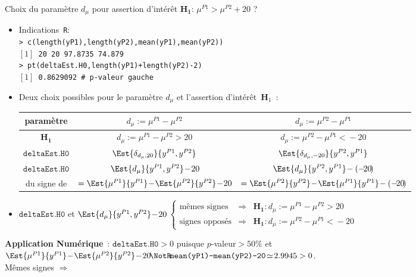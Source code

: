 \documentclass[11pt]{beamer}
\begin{document}
\begin{frame}
\frametitle{}

{\small
\begin{block}{Choix du paramètre $d_\mu$ pour assertion d'intérêt $\mathbf{H_1}$: $\mu^{P1} > \mu^{P2}+20$ ?}
\begin{itemize}
\item Indications~\texttt{R}:\\
\texttt{\scriptsize> c(length(yP1),length(yP2),mean(yP1),mean(yP2))\\
$[1]$ 20 20 97.8735 74.879 \\
> pt(deltaEst.H0,length(yP1)+length(yP2)-2)\\
$[1]$ 0.8629092  \# p-valeur gauche}\pause
\item Deux choix possibles pour le paramètre $d_\mu$ et l'assertion d'intérêt~$\mathbf{H}_1$~:\\
{\scriptsize \begin{tabular}{|c|c|c|}\hline
paramètre & $d_\mu\!:=\!\mu^{P1} \!-\! \mu^{P2}$ & $d_\mu:=\mu^{P2} \!-\! \mu^{P1}$\\\hline
$\mathbf{H_1}$ & $d_\mu\!:=\!\mu^{P1} \!-\! \mu^{P2}\!>\!20$ & $\!d_\mu:=\mu^{P2} \!-\! \mu^{P1}\!<\!-20$ \\\hline
$\mathtt{deltaEst.H0}$ & $\Est{\delta_{d_\mu,20}}{y^{P1},y^{P2}}$ & $\Est{\delta_{d_\mu,-20}}{y^{P2},y^{P1}}$ \\\hline
$\mathtt{deltaEst.H0}$ & $\Est{d_\mu}{y^{P1},y^{P2}}\!-\!20\!$ & $\Est{d_\mu}{y^{P2},y^{P1}}\!-(-\!20\!)$\\
du signe de & $=\Est{\mu^{P1}}{y^{P1}}\!-\!\Est{\mu^{P2}}{y^{P2}}\!-\!20\!$ & $=\Est{\mu^{P2}}{y^{P2}}\!-\!\Est{\mu^{P1}}{y^{P1}}\!-(-\!20\!)$ \\\hline
\end{tabular}}\pause
\item {\scriptsize $\mathtt{deltaEst.H0}$ et $\Est{d_\mu}{y^{P1},y^{P2}}\!-\!20\!$ $\left\{\begin{array}{ccl} 
\mbox{mêmes signes} & \Rightarrow & \mathbf{H_1}: d_\mu\!:=\!\mu^{P1} \!-\! \mu^{P2}\!>\!20\\
\mbox{signes opposés} &\Rightarrow &  \mathbf{H_1}: d_\mu\!:=\!\mu^{P2} \!-\! \mu^{P1}\!<\!-20
\end{array}\right.$
}\pause
\end{itemize}
\end{block}
}
{\small
\begin{block}{}
\textbf{Application Numérique}~: $\mathtt{deltaEst.H0}>0$ puisque $p$-valeur$>50\%$ \pause et 
$\Est{\mu^{P1}}{y^{P1}}\!-\!\Est{\mu^{P2}}{y^{P2}}\!-\!20\!\NotR\! \texttt{mean(yP1)-mean(yP2)-20}\!\simeq\! 2.9945>0$.\\\pause
Mêmes signes $\Rightarrow$  
\end{block}}
\end{frame}
 
\end{document}
